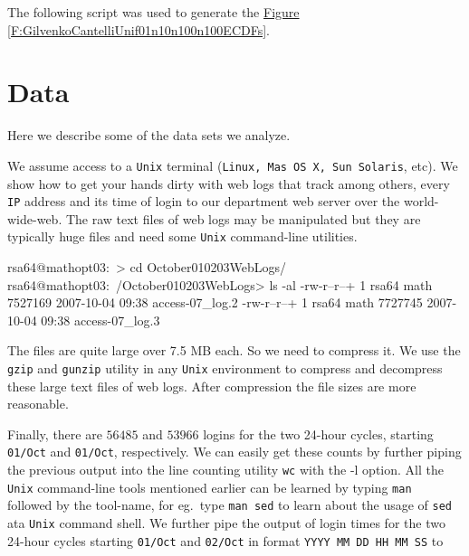 \begin{labwork}\label{Mf:GilvenkoCantelliUnif01n10n100n100ECDFs}
The following script was used to generate the \hyperref[F:GilvenkoCantelliUnif01n10n100n100ECDFs]{Figure \ref*{F:GilvenkoCantelliUnif01n10n100n100ECDFs}}.
{}
\end{labwork}

\section{Data}\label{S:Data}

Here we describe some of the data sets we analyze.
\begin{data}\label{DA:WebLogs}
We assume access to a {\tt Unix} terminal ({\tt Linux, Mas OS X, Sun Solaris}, etc).  We show how to get your hands dirty with web logs that track among others, every {\tt IP} address and its time of login to our department web server over the world-wide-web.  The raw text files of web logs may be manipulated but they are typically huge files and need some {\tt Unix} command-line utilities.
\begin{VrbM}
rsa64@mathopt03:~> cd October010203WebLogs/
rsa64@mathopt03:~/October010203WebLogs> ls -al
-rw-r--r--+  1 rsa64 math 7527169 2007-10-04 09:38 access-07_log.2
-rw-r--r--+  1 rsa64 math 7727745 2007-10-04 09:38 access-07_log.3
\end{VrbM}
The files are quite large over 7.5 MB each.  So we need to compress it.  We use the {\tt gzip} and {\tt gunzip} utility in any {\tt Unix} environment to compress and decompress these large text files of web logs.  After compression the file sizes are more reasonable.
Finally, there are $56485$ and $53966$ logins for the two 24-hour cycles, starting {\tt 01/Oct} and {\tt 01/Oct}, respectively.  We can easily get these counts by further piping the previous output into the line counting utility {\tt wc} with the {-l} option.  All the {\tt Unix} command-line tools mentioned earlier can be learned by typing {\tt man } followed by the tool-name, for eg.~type {\tt man sed} to learn about the usage of {\tt sed} ata  {\tt Unix} command shell.  We further pipe the output of login times for the two 24-hour cycles starting {\tt 01/Oct} and {\tt 02/Oct} in format {\tt YYYY MM DD HH MM SS} to 

\end{data}
